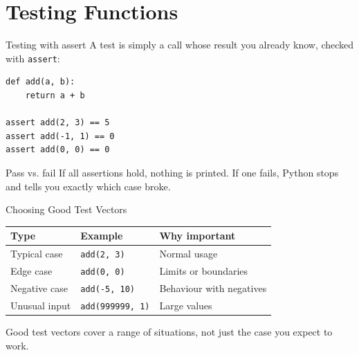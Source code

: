 \documentclass[9pt,aspectratio=169,xcolor=table]{beamer}
\newcommand{\striped}{\rowcolors{1}{white}{stripe}}
\begin{document}
\section{Testing Functions}

\begin{frame}[fragile]{Testing with assert}
    \leavevmode
    A test is simply a call whose result you already know, checked with
    \texttt{assert}:

\begin{lstlisting}
def add(a, b):
    return a + b

assert add(2, 3) == 5
assert add(-1, 1) == 0
assert add(0, 0) == 0
\end{lstlisting}

    \vspace{2mm}
    \begin{block}{Pass vs. fail}
        If all assertions hold, nothing is printed. If one fails,
        Python stops and tells you \alert{exactly which case} broke.
    \end{block}
\end{frame}

\begin{frame}{Choosing Good Test Vectors}
    \leavevmode
    \small
    \striped
    \begin{center}
    \begin{tabular}{p{2.6cm}p{3.0cm}p{3.6cm}}
        \toprule
        \textbf{Type} & \textbf{Example} & \textbf{Why important} \\
        \midrule
        Typical case & \texttt{add(2, 3)} & Normal usage \\
        Edge case & \texttt{add(0, 0)} & Limits or boundaries \\
        Negative case & \texttt{add(-5, 10)} & Behaviour with negatives \\
        Unusual input & \texttt{add(999999, 1)} & Large values \\
        \bottomrule
    \end{tabular}
    \end{center}

    \vspace{3mm}
    {\small Good test vectors cover a \alert{range} of situations, not
    just the case you expect to work.}
\end{frame}
\end{document}
